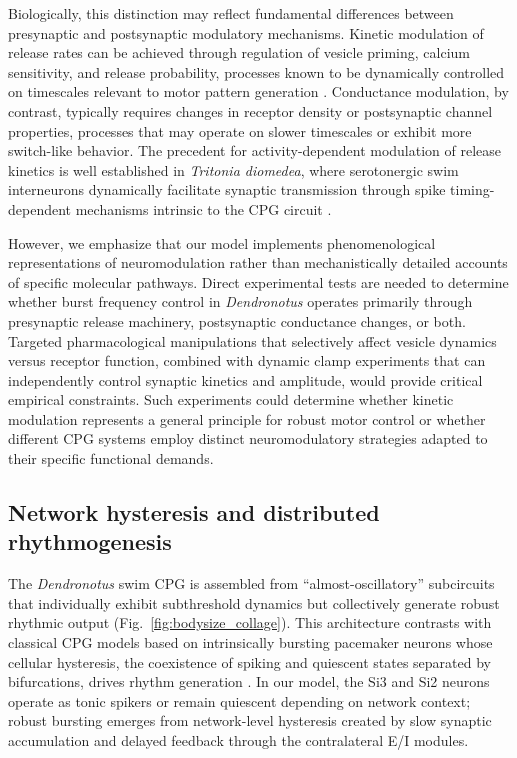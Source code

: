\documentclass[nofootinbib,aip,amsmath,amssymb,preprint,twocolumn,floatfix,10pt]{revtex4-2}
\begin{document}
Biologically, this distinction may reflect fundamental differences between presynaptic and postsynaptic modulatory mechanisms. Kinetic modulation of release rates can be achieved through regulation of vesicle priming, calcium sensitivity, and release probability, processes known to be dynamically controlled on timescales relevant to motor pattern generation \cite{NeherBrose2018, jackman2017mechanisms}. Conductance modulation, by contrast, typically requires changes in receptor density or postsynaptic channel properties, processes that may operate on slower timescales or exhibit more switch-like behavior. The precedent for activity-dependent modulation of release kinetics is well established in \textit{Tritonia diomedea}, where serotonergic swim interneurons dynamically facilitate synaptic transmission through spike timing-dependent mechanisms intrinsic to the CPG circuit \cite{katz1994dynamic, sakurai2003spike}.

However, we emphasize that our model implements phenomenological representations of neuromodulation rather than mechanistically detailed accounts of specific molecular pathways. Direct experimental tests are needed to determine whether burst frequency control in \textit{Dendronotus} operates primarily through presynaptic release machinery, postsynaptic conductance changes, or both. Targeted pharmacological manipulations that selectively affect vesicle dynamics versus receptor function, combined with dynamic clamp experiments that can independently control synaptic kinetics and amplitude, would provide critical empirical constraints. Such experiments could determine whether kinetic modulation represents a general principle for robust motor control or whether different CPG systems employ distinct neuromodulatory strategies adapted to their specific functional demands.

\subsection{Network hysteresis and distributed rhythmogenesis}

The \textit{Dendronotus} swim CPG is assembled from ``almost-oscillatory'' subcircuits that individually exhibit subthreshold dynamics but collectively generate robust rhythmic output (Fig.~\ref{fig:bodysize_collage}). This architecture contrasts with classical CPG models based on intrinsically bursting pacemaker neurons whose cellular hysteresis, the coexistence of spiking and quiescent states separated by bifurcations, drives rhythm generation \cite{plant81, Rinzel87b, RL87}. In our model, the Si3 and Si2 neurons operate as tonic spikers or remain quiescent depending on network context; robust bursting emerges from network-level hysteresis created by slow synaptic accumulation and delayed feedback through the contralateral E/I modules.
\end{document}
